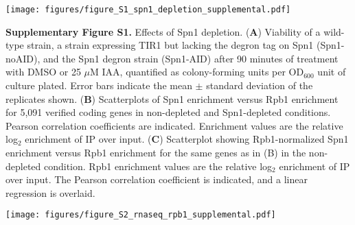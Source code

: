 \documentclass[8pt]{extarticle}
\begin{document}

{\texttt{[image: figures/figure\_S1\_spn1\_depletion\_supplemental.pdf]}\par}

\vspace{2em}
\textbf{Supplementary Figure S1.} Effects of Spn1 depletion.
(\textbf{A}) Viability of a wild-type strain, a strain expressing TIR1 but lacking the degron tag on Spn1 (Spn1-noAID), and the Spn1 degron strain (Spn1-AID) after 90 minutes of treatment with DMSO or 25 $\mu$M IAA, quantified as colony-forming units per OD$_{600}$ unit of culture plated.
Error bars indicate the mean $\pm$ standard deviation of the replicates shown.
(\textbf{B}) Scatterplots of Spn1 enrichment versus Rpb1 enrichment for 5,091 verified coding genes in non-depleted and Spn1-depleted conditions.
Pearson correlation coefficients are indicated.
Enrichment values are the relative log$_2$ enrichment of IP over input.
(\textbf{C}) Scatterplot showing Rpb1-normalized Spn1 enrichment versus Rpb1 enrichment for the same genes as in (B) in the non-depleted condition.
Rpb1 enrichment values are the relative log$_2$ enrichment of IP over input.
The Pearson correlation coefficient is indicated, and a linear regression is overlaid.

\newpage


{\texttt{[image: figures/figure\_S2\_rnaseq\_rpb1\_supplemental.pdf]}\par}
\end{document}
